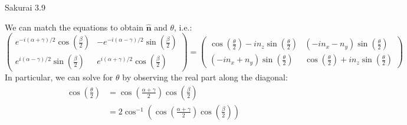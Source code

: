 \documentclass{article}
\newcommand{\bs}{\boldsymbol}
\begin{document}
\begin{section}{Sakurai 3.9}
\begin{tcolorbox}
	We can match the equations to obtain $\bs{\hat{n}}$ and $\theta$, i.e.:
	$$
		\begin{pmatrix}
			e^{-i(\alpha + \gamma)/2} \cos \left( \frac{\beta}{2} \right) & -e^{-i(\alpha - \gamma)/2} \sin \left( \frac{\beta}{2} \right) \\
			e^{i(\alpha - \gamma)/2} \sin \left( \frac{\beta}{2} \right)  & e^{i(\alpha + \gamma)/2} \cos \left( \frac{\beta}{2} \right)
		\end{pmatrix}
		=
		\begin{pmatrix}
			\cos \left( \frac{\theta}{2} \right) - i n_z \sin \left( \frac{\theta}{2} \right)
			 & (-i n_x - n_y) \sin \left( \frac{\theta}{2} \right)                               \\
			(-i n_x + n_y) \sin \left( \frac{\theta}{2} \right)
			 & \cos \left( \frac{\theta}{2} \right) + i n_z \sin \left( \frac{\theta}{2} \right)
		\end{pmatrix}
	$$
	In particular, we can solve for $\theta$ by observing the real part along the diagonal:
	\begin{align*}
		\cos \left( \frac{\theta}{2} \right) & = \cos \left( \frac{\alpha + \gamma}{2} \right) \cos \left( \frac{\beta}{2} \right)                            \\
		                                     & = 2 \cos^{-1} \left( \cos \left( \frac{\alpha + \gamma}{2} \right) \cos \left( \frac{\beta}{2} \right) \right)
	\end{align*}
\end{tcolorbox}
\end{section}
\end{document}
